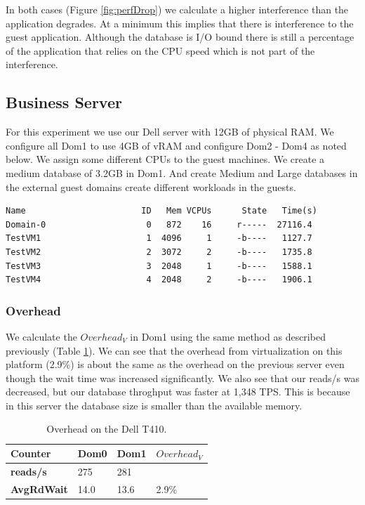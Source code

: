 In both cases (Figure \ref{fig:perfDrop}) we calculate a higher interference than the application degrades.  At a minimum this implies that there is interference to the guest application.  Although the database is I/O bound there is still a percentage of the application that relies on the CPU speed which is not part of the interference.  

\subsection{Business Server}
For this experiment we use our Dell server with 12GB of physical RAM. We configure all Dom1 to use 4GB of vRAM and configure Dom2 - Dom4 as noted below.  We assign some different CPUs to the guest machines. We create a medium database of 3.2GB in Dom1.   And create Medium and Large databases in the external guest domains create different workloads in the guests.

\begin{Verbatim}
Name                       ID   Mem VCPUs      State   Time(s)
Domain-0                    0   872    16     r-----  27116.4
TestVM1                     1  4096     1     -b----   1127.7
TestVM2                     2  3072     2     -b----   1735.8
TestVM3                     3  2048     1     -b----   1588.1
TestVM4                     4  2048     2     -b----   1906.1
\end{Verbatim}

\subsubsection{Overhead}
We calculate the $Overhead_V$ in Dom1 using the same method as described previously (Table \ref{tab:OverheadDell}).  We can see that the overhead from virtualization on this platform (2.9\%) is about the same as the overhead on the previous server even though the wait time was increased significantly.  We also see that our reads/s was decreased, but our database throghput was faster at 1,348 TPS.  This is because in this server the database size is smaller than the available memory.

\begin{table}[h]
\begin{tabular}{ l l l p{5cm} }
  Counter     & Dom0 & Dom1 & $Overhead_V$ \\
  \hline
    \textbf{reads/s}    & 275  & 281 & \\
    \textbf{AvgRdWait}  & 14.0 & 13.6 & 2.9\% \\ 
  \hline
\end{tabular}
\caption{Overhead on the Dell T410.}
\label{tab:OverheadDell}
\end{table}

